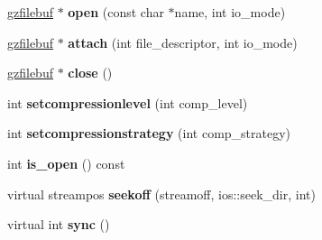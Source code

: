 \begin{DoxyCompactItemize}
\item 
\hypertarget{classgzfilebuf_ae1fbc989b2dae79dba798556542c147c}{\hyperlink{classgzfilebuf}{gzfilebuf} $\ast$ {\bfseries open} (const char $\ast$name, int io\+\_\+mode)}\label{classgzfilebuf_ae1fbc989b2dae79dba798556542c147c}

\item 
\hypertarget{classgzfilebuf_a3ececdeaa35a8b606182cc23c9908891}{\hyperlink{classgzfilebuf}{gzfilebuf} $\ast$ {\bfseries attach} (int file\+\_\+descriptor, int io\+\_\+mode)}\label{classgzfilebuf_a3ececdeaa35a8b606182cc23c9908891}

\item 
\hypertarget{classgzfilebuf_a18e628926f455f41d7715c2ddd9c0e64}{\hyperlink{classgzfilebuf}{gzfilebuf} $\ast$ {\bfseries close} ()}\label{classgzfilebuf_a18e628926f455f41d7715c2ddd9c0e64}

\item 
\hypertarget{classgzfilebuf_a8bbfda3e29baf20e4330e3a9d7ee4a54}{int {\bfseries setcompressionlevel} (int comp\+\_\+level)}\label{classgzfilebuf_a8bbfda3e29baf20e4330e3a9d7ee4a54}

\item 
\hypertarget{classgzfilebuf_a47d4b9f1257fd12dd21847b71ad1d49d}{int {\bfseries setcompressionstrategy} (int comp\+\_\+strategy)}\label{classgzfilebuf_a47d4b9f1257fd12dd21847b71ad1d49d}

\item 
\hypertarget{classgzfilebuf_a3db8f79036743d42bc51eb9dd7b65b2d}{int {\bfseries is\+\_\+open} () const }\label{classgzfilebuf_a3db8f79036743d42bc51eb9dd7b65b2d}

\item 
\hypertarget{classgzfilebuf_a0ab89070031cbc37679365582180ae3c}{virtual streampos {\bfseries seekoff} (streamoff, ios\+::seek\+\_\+dir, int)}\label{classgzfilebuf_a0ab89070031cbc37679365582180ae3c}

\item 
\hypertarget{classgzfilebuf_ae537a3f86b37de7bf27d2aff0cded07e}{virtual int {\bfseries sync} ()}\label{classgzfilebuf_ae537a3f86b37de7bf27d2aff0cded07e}


\end{DoxyCompactItemize}
